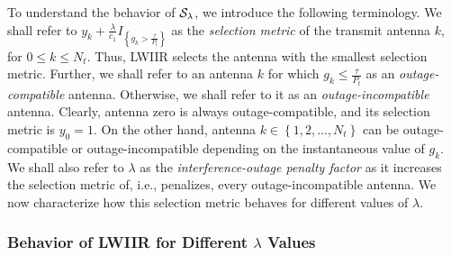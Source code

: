 \documentclass[12pt,draftcls,peerreview,onecolumn]{IEEEtran}
\newcommand{\cbrac}[1]{\left\{{#1}\right\}}
\newcommand{\indic}[1]{I_{\cbrac{#1}}}
\newcommand{\lam}{\lambda}
\newcommand{\Nt}{{N_t}}
\newcommand{\Pt}{{P_t}}
\newcommand{\puch}{g}
\newcommand{\gk}[1]{{\puch_{#1}}}
\newcommand{\itau}{\tau}
\newcommand{\cone}{c_{1}}
\newcommand{\taubypt}{\frac{\itau}{\Pt}}
\newcommand{\gkgrtaubypt}[1]{{\gk{#1}}>\taubypt}
\newcommand{\gklttaubypt}[1]{{\gk{#1}}\leq\taubypt}
\newcommand{\gindic}[1]{\indic{\gkgrtaubypt{#1}}}
\newcommand{\lambym}{\frac{\lam}{\cone}}
\newcommand{\yk}[1]{y_{#1}}
\newcommand{\ykplusgk}[1]{ \yk{#1} + \lambym\gindic{#1}}
\newcommand{\antopts}{\left\{1,2,\ldots,\Nt\right\}}
\newcommand{\callamrule}{{\cal S_{{\lam}}}}
\begin{document}
To understand the behavior of $\callamrule$, we introduce the following terminology. We shall refer to 
$\ykplusgk{k}$
as the {\em selection metric} of the transmit antenna $k$, for $0\leq k \leq\Nt$. Thus, LWIIR selects the antenna with the smallest selection metric. Further, we shall refer to an antenna $k$ for which $\gklttaubypt{k}$ as an {\em outage-compatible} antenna. Otherwise, we shall refer to it as an {\em outage-incompatible} antenna.  Clearly, antenna zero is always outage-compatible, and its selection metric is $\yk{0}=1$. On the other hand, antenna $k\in\antopts$ can be outage-compatible or outage-incompatible depending on the instantaneous value of $\gk{k}$. We shall also refer to $\lam$ as the {\em interference-outage penalty factor} as it increases the selection metric of, i.e., penalizes, every outage-incompatible antenna. We now characterize  how this selection metric behaves for different values of $\lam$.

\subsubsection{Behavior of LWIIR for Different $\lam$ Values}
\label{sec:LWIIR_prop}
\end{document}
